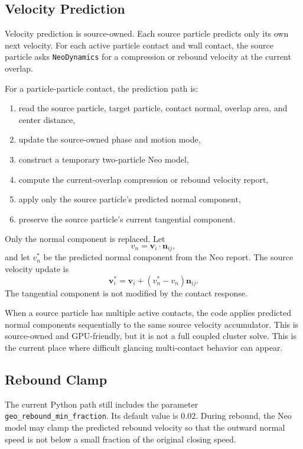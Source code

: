 \subsection{Velocity Prediction}

Velocity prediction is source-owned.  Each source particle predicts only its
own next velocity.  For each active particle contact and wall contact, the
source particle asks \texttt{NeoDynamics} for a compression or rebound velocity
at the current overlap.

For a particle-particle contact, the prediction path is:
\begin{enumerate}
    \item read the source particle, target particle, contact normal, overlap
          area, and center distance,
    \item update the source-owned phase and motion mode,
    \item construct a temporary two-particle Neo model,
    \item compute the current-overlap compression or rebound velocity report,
    \item apply only the source particle's predicted normal component,
    \item preserve the source particle's current tangential component.
\end{enumerate}

Only the normal component is replaced.  Let
\[
    v_n = \mathbf{v}_i \cdot \mathbf{n}_{ij},
\]
and let \(v_n^\ast\) be the predicted normal component from the Neo report.
The source velocity update is
\[
    \mathbf{v}_i^\ast
    =
    \mathbf{v}_i
    +
    (v_n^\ast - v_n)\mathbf{n}_{ij}.
\]
The tangential component is not modified by the contact response.

When a source particle has multiple active contacts, the code applies predicted
normal components sequentially to the same source velocity accumulator.  This
is source-owned and GPU-friendly, but it is not a full coupled cluster solve.
This is the current place where difficult glancing multi-contact behavior can
appear.

\subsection{Rebound Clamp}

The current Python path still includes the parameter
\texttt{geo\_rebound\_min\_fraction}.  Its default value is \(0.02\).  During
rebound, the Neo model may clamp the predicted rebound velocity so that the
outward normal speed is not below a small fraction of the original closing
speed.

